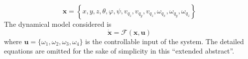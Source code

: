 \documentclass[conference]{IEEEtran}
\newcommand{\refp}[1]{(\ref{#1})}
\begin{document}
\begin{equation}
\mathbf{x}=\left\lbrace  x,y,z, \theta,\varphi,\psi, v_{q_z},v_{q_y},v_{q_z},\omega_{q_x},\omega_{q_y},\omega_{q_z} \right\rbrace
\label{eq:sv}
\end{equation}
The dynamical model considered is
\begin{equation}
	\dot{\mathbf{x}}=\mathcal{F}(\mathbf{x},\mathbf{u})
	\label{ec:fxu}
\end{equation}
where $\mathbf{u}=\{\omega_1,\omega_2,\omega_3,\omega_4\}$ is the controllable input of the system. The detailed equations are omitted for the sake of simplicity in this ``extended abstract''.
\end{document}
